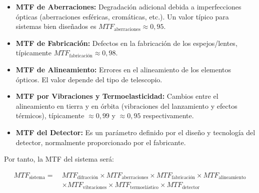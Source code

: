 \begin{itemize}
\begin{equation}
B =
\begin{cases}
\frac{2R^2}{\pi}\left[\cos^{-1}(Y) - Y\sqrt{1 - Y^2}\right], & \text{si } 0 \leq Y \leq 1 \\
0, & \text{en otro caso}
\end{cases}
\end{equation}

\begin{equation}
C =
\begin{cases}
-2R^2, & \text{si } 0 < X \leq \frac{1 - R}{2} \\
\frac{2R}{\pi} \sin\alpha + \frac{1 + R^2}{\pi} \alpha - \frac{2(1 - R^2)}{\pi} \tan^{-1}\left[\left(\frac{1 + R}{1 - R}\right)\tan\left(\frac{\alpha}{2}\right)\right] - 2R^2, & \text{si } \frac{1 - R}{2} < X < \frac{1 + R}{2} \\
0, & \text{si } X \geq \frac{1 + R}{2}
\end{cases}
\end{equation}

Para calcular el requerimiento de MTF, se impone $f_x=f_{Ny}*f$. 
  \item \textbf{MTF de Aberraciones:} Degradación adicional debida a imperfecciones ópticas (aberraciones esféricas, cromáticas, etc.). Un valor típico para sistemas bien diseñados es $MTF_{\text{aberraciones}} \approx 0{,}95$.

  \item \textbf{MTF de Fabricación:} Defectos en la fabricación de los espejos/lentes, típicamente $MTF_{\text{fabricación}} \approx 0{,}98$.

  \item \textbf{MTF de Alineamiento:} Errores en el alineamiento de los elementos ópticos. El valor depende del tipo de telescopio.

  \item \textbf{MTF por Vibraciones y Termoelasticidad:} Cambios entre el alineamiento en tierra y en órbita (vibraciones del lanzamiento y efectos térmicos), típicamente $\approx 0{,}99$ y $\approx 0{,}95$ respectivamente.

  \item \textbf{MTF del Detector:} Es un parámetro definido por el diseño y tecnología del detector, normalmente proporcionado por el fabricante.
  
\end{itemize}
Por tanto, la MTF del sistema será:

\begin{align}
MTF_{\text{sistema}} =\ & MTF_{\text{difracción}} \times MTF_{\text{aberraciones}} \times MTF_{\text{fabricación}} \times MTF_{\text{alineamiento}} \nonumber \\
& \times MTF_{\text{vibraciones}} \times MTF_{\text{termoelástico}} \times MTF_{\text{detector}}
\end{align}


